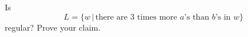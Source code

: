 Is 
\[
L = \{w \,|\, \text{there are 3 times more $a$'s than $b$'s in $w$} \}
\]
regular? Prove your claim.
